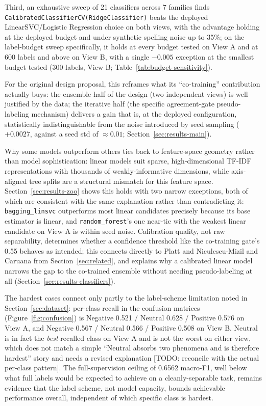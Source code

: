 \documentclass[conference]{IEEEtran}
\begin{document}
Third, an exhaustive sweep of 21 classifiers across 7 families finds
\texttt{CalibratedClassifierCV(RidgeClassifier)} beats the deployed
LinearSVC/Logistic Regression choice on both views, with the advantage
holding at the deployed budget and under synthetic spelling noise up to
35\%; on the label-budget sweep specifically, it holds at every budget
tested on View A and at 600 labels and above on View B, with a single
$-0.005$ exception at the smallest budget tested (300 labels, View B;
Table~\ref{tab:budget-sensitivity}).

For the original design proposal, this reframes what its ``co-training''
contribution actually buys: the ensemble half of the design (two independent
views) is well justified by the data; the iterative half (the specific
agreement-gate pseudo-labeling mechanism) delivers a gain that is, at the
deployed configuration, statistically indistinguishable from the noise
introduced by seed sampling ($+0.0027$, against a seed std of
$\approx 0.01$; Section~\ref{sec:results-main}).

Why some models outperform others ties back to feature-space geometry rather
than model sophistication: linear models suit sparse, high-dimensional TF-IDF
representations with thousands of weakly-informative dimensions, while
axis-aligned tree splits are a structural mismatch for this feature space.
Section~\ref{sec:results-zoo} shows this holds with two narrow exceptions,
both of which are consistent with the same explanation rather than
contradicting it: \texttt{bagging\_linsvc} outperforms most linear candidates
precisely because its base estimator is linear, and \texttt{random\_forest}'s
one near-tie with the weakest linear candidate on View A is within seed
noise. Calibration quality, not raw separability, determines whether a
confidence threshold like the co-training gate's 0.55 behaves as intended;
this connects directly to Platt \citep{platt1999probabilistic} and
Niculescu-Mizil and Caruana \citep{niculescumizil2005predicting} from
Section~\ref{sec:related}, and explains why a calibrated linear model narrows
the gap to the co-trained ensemble without needing pseudo-labeling at all
(Section~\ref{sec:results-classifiers}).

The hardest cases connect only partly to the label-scheme limitation noted in
Section~\ref{sec:dataset}: per-class recall in the confusion matrices
(Figure~\ref{fig:confusion}) is Negative 0.521 / Neutral 0.628 / Positive
0.576 on View A, and Negative 0.567 / Neutral 0.566 / Positive 0.508 on View
B. Neutral is in fact the \emph{best}-recalled class on View A and is not the
worst on either view, which does not match a simple ``Neutral absorbs two
phenomena and is therefore hardest'' story and needs a revised explanation
[TODO: reconcile with the actual per-class pattern]. The full-supervision
ceiling of 0.6562 macro-F1, well below what full labels would be expected to
achieve on a cleanly-separable task, remains evidence that the label scheme,
not model capacity, bounds achievable performance overall, independent of
which specific class is hardest.
\end{document}
